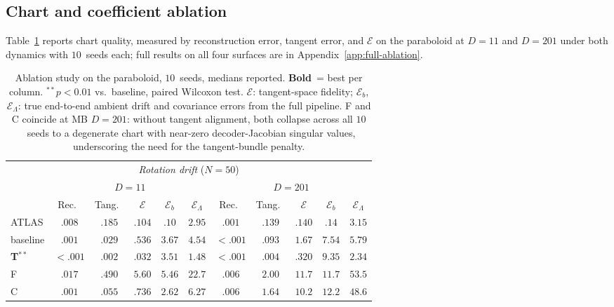 \documentclass[11pt]{article}
\newcommand{\cE}{\mathcal{E}}
\begin{document}
\subsection{Chart and coefficient ablation}\label{ssec:ablation}

Table~\ref{tab:ablation} reports chart quality,
measured by reconstruction error, tangent error, and
$\cE$ on the
paraboloid at $D{=}11$ and $D{=}201$ under both dynamics
with $10$~seeds each; full results on all four surfaces are
in Appendix~\ref{app:full-ablation}.

\begin{table}[ht]
\centering
\caption{Ablation study on the paraboloid, $10$~seeds,
medians reported. \textbf{Bold}~= best per column.
${}^{**}p{<}0.01$ vs.\ baseline, paired Wilcoxon test.
$\cE$: tangent-space fidelity;
$\cE_b$, $\cE_\Lambda$: true end-to-end ambient
drift and covariance errors from the full pipeline.
F and C coincide at MB $D{=}201$: without tangent
alignment, both collapse across all $10$~seeds to a
degenerate chart with near-zero decoder-Jacobian
singular values, underscoring the need for the
tangent-bundle penalty.}
\label{tab:ablation}
\footnotesize
\begin{tabular}{l ccccc ccccc}
\toprule
\multicolumn{11}{c}{\emph{Rotation drift} ($N{=}50$)} \\
\cmidrule(lr){1-11}
 & \multicolumn{5}{c}{$D{=}11$} & \multicolumn{5}{c}{$D{=}201$} \\
\cmidrule(lr){2-6} \cmidrule(lr){7-11}
 & Rec.\ & Tang.\ & $\cE$ & $\cE_b$ & $\cE_\Lambda$
 & Rec.\ & Tang.\ & $\cE$ & $\cE_b$ & $\cE_\Lambda$ \\
\midrule
ATLAS    & $.008$ & $.185$ & $.104$ & $\mathbf{.10}$ & $2.95$
         & $.001$ & $.139$ & $\mathbf{.140}$ & $\mathbf{.14}$ & $3.15$ \\
baseline & $.001$ & $.029$ & $.536$ & $3.67$ & $4.54$
         & ${\scriptstyle <}.001$ & $.093$ & $1.67$ & $7.54$ & $5.79$ \\
\textbf{T}$^{**}$ & $\mathbf{{\scriptstyle <}.001}$ & $\mathbf{.002}$ & $\mathbf{.032}$ & $3.51$ & $1.48$
         & $\mathbf{{\scriptstyle <}.001}$ & $\mathbf{.004}$ & $.320$ & $9.35$ & $\mathbf{2.34}$ \\
F        & $.017$ & $.490$ & $5.60$ & $5.46$ & $22.7$
         & $.006$ & $2.00$ & $11.7$ & $11.7$ & $53.5$ \\
C        & $.001$ & $.055$ & $.736$ & $2.62$ & $6.27$
         & $.006$ & $1.64$ & $10.2$ & $12.2$ & $48.6$ \\

\end{tabular}
\end{table}
\end{document}
